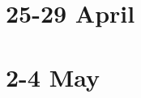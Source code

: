 \documentclass[12pt]{beamer}
\theoremstyle{plain}
\theoremstyle{definition}
\begin{document}
\section[Week 14]{25-29 April}




\section[Week 15]{2-4 May}





%
%
%
%
%
%
%

\end{document}
